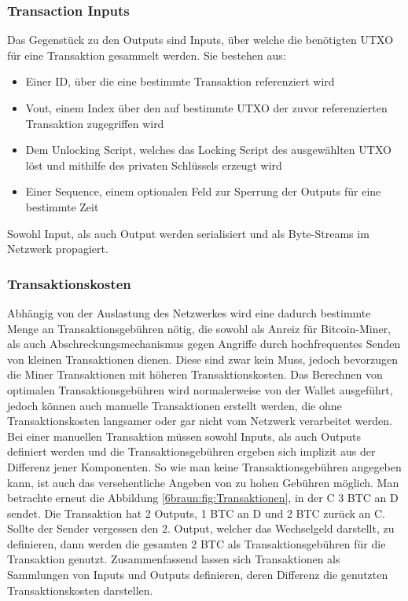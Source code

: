 \subsubsection{Transaction Inputs}
Das Gegenstück zu den Outputs sind Inputs, über welche die benötigten UTXO für eine Transaktion gesammelt werden. Sie bestehen aus:
\begin{itemize}
	\item Einer ID, über die eine bestimmte Transaktion referenziert wird
	\item Vout, einem Index über den auf bestimmte UTXO der zuvor referenzierten Transaktion zugegriffen wird
	\item Dem Unlocking Script, welches das Locking Script des ausgewählten UTXO löst und mithilfe des privaten Schlüssels erzeugt wird
	\item Einer Sequence, einem optionalen Feld zur Sperrung der Outputs für eine bestimmte Zeit
\end{itemize}
Sowohl Input, als auch Output werden serialisiert und als Byte-Streams im Netzwerk propagiert.\\
\subsubsection{Transaktionskosten}
Abhängig von der Auslastung des Netzwerkes wird eine dadurch bestimmte Menge an Transaktionsgebühren nötig, die sowohl als Anreiz für Bitcoin-Miner, als auch Abschreckungsmechanismus gegen Angriffe durch hochfrequentes Senden von kleinen Transaktionen dienen.
Diese sind zwar kein Muss, jedoch bevorzugen die Miner Transaktionen mit höheren Transaktionskosten. 
Das Berechnen von optimalen Transaktionsgebühren wird normalerweise von der Wallet ausgeführt, jedoch können auch manuelle Transaktionen erstellt werden, die ohne Transaktionskosten langsamer oder gar nicht vom Netzwerk verarbeitet werden.
Bei einer manuellen Transaktion müssen sowohl Inputs, als auch Outputs definiert werden und die Transaktionsgebühren ergeben sich implizit aus der Differenz jener Komponenten. So wie man keine Transaktionsgebühren angegeben kann, ist auch das versehentliche Angeben von zu hohen Gebühren möglich. Man betrachte erneut die Abbildung \ref{6braun:fig:Transaktionen}, in der C 3 BTC an D sendet. Die Transaktion hat 2 Outputs, 1 BTC an D und 2 BTC zurück an C. Sollte der Sender vergessen den 2. Output, welcher das Wechselgeld darstellt, zu definieren, dann werden die gesamten 2 BTC als Transaktionsgebühren für die Transaktion genutzt.
Zusammenfassend lassen sich Transaktionen als Sammlungen von Inputs und Outputs definieren, deren Differenz die genutzten Transaktionskosten darstellen.
